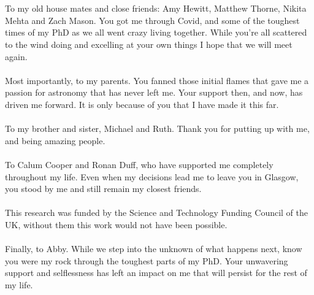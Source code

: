 \begin{acknowledgements}
\\
\\
To my old house mates and close friends: Amy Hewitt, Matthew Thorne, Nikita Mehta and Zach Mason. You got me through Covid, and some of the toughest times of my PhD as we all went crazy living together. While you're all scattered to the wind doing and excelling at your own things I hope that we will meet again.
\\
\\
Most importantly, to my parents. You fanned those initial flames that gave me a passion for astronomy that has never left me. Your support then, and now, has driven me forward. It is only because of you that I have made it this far.
\\
\\
To my brother and sister, Michael and Ruth. Thank you for putting up with me, and being amazing people.
\\
\\
To Calum Cooper and Ronan Duff, who have supported me completely throughout my life. Even when my decisions lead me to leave you in Glasgow, you stood by me and still remain my closest friends.
\\
\\
This research was funded by the Science and Technology Funding Council of the UK, without them this work would not have been possible.
\\
\\
Finally, to Abby. While we step into the unknown of what happens next, know you were my rock through the toughest parts of my PhD. Your unwavering support and selflessness has left an impact on me that will persist for the rest of my life.

\end{acknowledgements}

